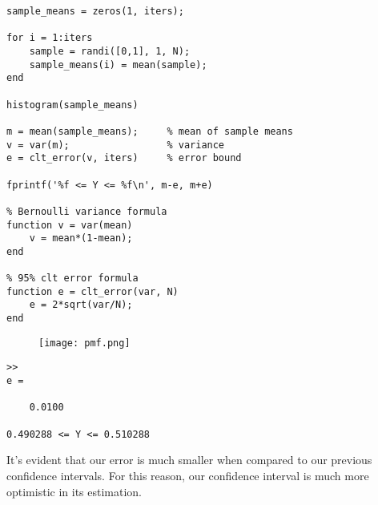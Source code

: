 \documentclass{oxmathproblems}
\begin{document}
\begin{questions}
\begin{parts}
\begin{lstlisting}
sample_means = zeros(1, iters);

for i = 1:iters
    sample = randi([0,1], 1, N);
    sample_means(i) = mean(sample);
end

histogram(sample_means)

m = mean(sample_means);     % mean of sample means
v = var(m);                 % variance 
e = clt_error(v, iters)     % error bound

fprintf('%f <= Y <= %f\n', m-e, m+e)

% Bernoulli variance formula
function v = var(mean)
    v = mean*(1-mean);
end

% 95% clt error formula
function e = clt_error(var, N)
    e = 2*sqrt(var/N);
end
\end{lstlisting}
    \newpage
    \begin{figure}[h!]
        \centering
        \texttt{[image: pmf.png]}
        \label{fig:pmf}
    \end{figure}
\begin{verbatim}
>>
e =

    0.0100

0.490288 <= Y <= 0.510288
\end{verbatim}
    It's evident that our error is much smaller when compared to our previous confidence intervals. For this reason, our confidence interval is much more optimistic in its estimation.
\end{parts}

\end{questions}
\end{document}
